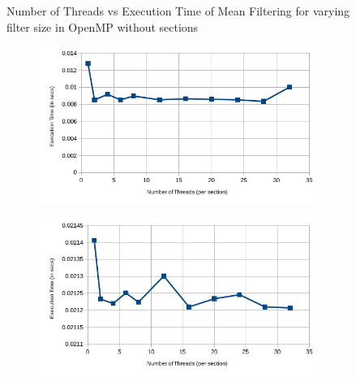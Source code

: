 \documentclass{article}
\begin{document}
\begin{figure}[!htbp]
	\caption{Number of Threads vs Execution Time of Mean Filtering for varying filter size in OpenMP without sections}
\end{figure}

\begin{figure}[!htbp]

	\centering
	\begin{subfigure}[!htbp]{\textwidth}
		\centering
		\includegraphics[scale=0.8]{with-sections-3x3-performance}
	\end{subfigure}
	
	\begin{subfigure}[!htbp]{\textwidth}
		\centering
		\includegraphics[scale=0.8]{with-sections-5x5-performance}
	\end{subfigure}
	

\end{figure}
\end{document}
